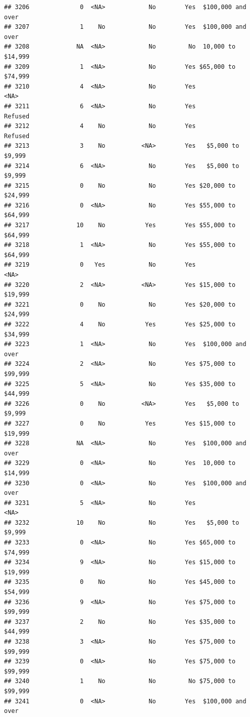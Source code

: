 \documentclass[man]{apa6}
\begin{document}
\begin{verbatim}
## 3206              0  <NA>            No        Yes  $100,000 and over
## 3207              1    No            No        Yes  $100,000 and over
## 3208             NA  <NA>            No         No  10,000 to $14,999
## 3209              1  <NA>            No        Yes $65,000 to $74,999
## 3210              4  <NA>            No        Yes               <NA>
## 3211              6  <NA>            No        Yes            Refused
## 3212              4    No            No        Yes            Refused
## 3213              3    No          <NA>        Yes   $5,000 to $9,999
## 3214              6  <NA>            No        Yes   $5,000 to $9,999
## 3215              0    No            No        Yes $20,000 to $24,999
## 3216              0  <NA>            No        Yes $55,000 to $64,999
## 3217             10    No           Yes        Yes $55,000 to $64,999
## 3218              1  <NA>            No        Yes $55,000 to $64,999
## 3219              0   Yes            No        Yes               <NA>
## 3220              2  <NA>          <NA>        Yes $15,000 to $19,999
## 3221              0    No            No        Yes $20,000 to $24,999
## 3222              4    No           Yes        Yes $25,000 to $34,999
## 3223              1  <NA>            No        Yes  $100,000 and over
## 3224              2  <NA>            No        Yes $75,000 to $99,999
## 3225              5  <NA>            No        Yes $35,000 to $44,999
## 3226              0    No          <NA>        Yes   $5,000 to $9,999
## 3227              0    No           Yes        Yes $15,000 to $19,999
## 3228             NA  <NA>            No        Yes  $100,000 and over
## 3229              0  <NA>            No        Yes  10,000 to $14,999
## 3230              0  <NA>            No        Yes  $100,000 and over
## 3231              5  <NA>            No        Yes               <NA>
## 3232             10    No            No        Yes   $5,000 to $9,999
## 3233              0  <NA>            No        Yes $65,000 to $74,999
## 3234              9  <NA>            No        Yes $15,000 to $19,999
## 3235              0    No            No        Yes $45,000 to $54,999
## 3236              9  <NA>            No        Yes $75,000 to $99,999
## 3237              2    No            No        Yes $35,000 to $44,999
## 3238              3  <NA>            No        Yes $75,000 to $99,999
## 3239              0  <NA>            No        Yes $75,000 to $99,999
## 3240              1    No            No         No $75,000 to $99,999
## 3241              0  <NA>            No        Yes  $100,000 and over

\end{verbatim}
\end{document}
